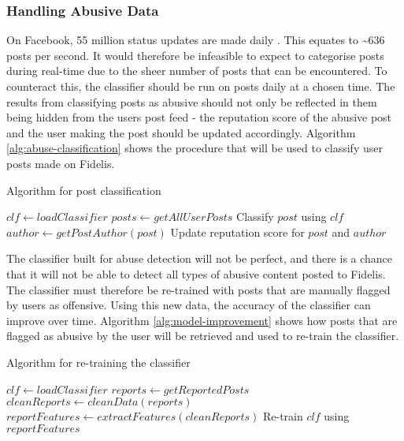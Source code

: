 \subsubsection{Handling Abusive Data}
On Facebook, 55 million status updates are made daily \cite{kissmetrics:fb-stats}. This equates to \textasciitilde 636 posts per second. It would therefore be infeasible to expect to categorise posts during real-time due to the sheer number of posts that can be encountered. To counteract this, the classifier should be run on posts daily at a chosen time. The results from classifying posts as abusive should not only be reflected in them being hidden from the users post feed - the reputation score of the abusive post and the user making the post should be updated accordingly. Algorithm \ref{alg:abuse-classification} shows the procedure that will be used to classify user posts made on Fidelis.

\begin{algorithm}
\caption{Algorithm for post classification}
\label{alg:abuse-classification}
\begin{algorithmic}[1]
\State $clf\gets loadClassifier$
\State $posts\gets getAllUserPosts$
	\State Classify $post$ using $clf$
		\State $author\gets getPostAuthor(post)$
		\State Update reputation score for $post$ and $author$
	\EndIf
\EndFor
\end{algorithmic}
\end{algorithm}

The classifier built for abuse detection will not be perfect, and there is a chance that it will not be able to detect all types of abusive content posted to Fidelis. The classifier must therefore be re-trained with posts that are manually flagged by users as offensive. Using this new data, the accuracy of the classifier can improve over time. Algorithm \ref{alg:model-improvement} shows how posts that are flagged as abusive by the user will be retrieved and used to re-train the classifier.

\begin{algorithm}
\caption{Algorithm for re-training the classifier}
\label{alg:model-improvement}
\begin{algorithmic}[1]
\State $clf\gets loadClassifier$
\State $reports\gets getReportedPosts$
\State $cleanReports\gets cleanData(reports)$
\State $reportFeatures\gets extractFeatures(cleanReports)$
\State Re-train $clf$ using $reportFeatures$
\end{algorithmic}
\end{algorithm}
